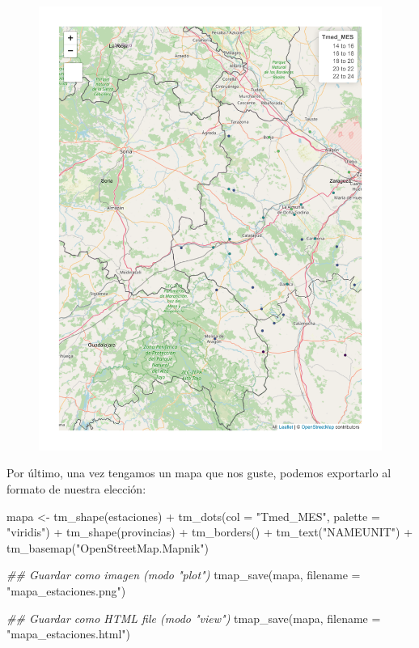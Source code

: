 \documentclass[
  letterpaper,
  DIV=11,
  numbers=noendperiod]{scrreprt}
\newenvironment{Shaded}{\begin{snugshade}}{\end{snugshade}}
\newcommand{\AttributeTok}[1]{\textcolor[rgb]{0.40,0.45,0.13}{#1}}
\newcommand{\DocumentationTok}[1]{\textcolor[rgb]{0.37,0.37,0.37}{\textit{#1}}}
\newcommand{\FunctionTok}[1]{\textcolor[rgb]{0.28,0.35,0.67}{#1}}
\newcommand{\NormalTok}[1]{\textcolor[rgb]{0.00,0.23,0.31}{#1}}
\newcommand{\OtherTok}[1]{\textcolor[rgb]{0.00,0.23,0.31}{#1}}
\newcommand{\SpecialCharTok}[1]{\textcolor[rgb]{0.37,0.37,0.37}{#1}}
\newcommand{\StringTok}[1]{\textcolor[rgb]{0.13,0.47,0.30}{#1}}
\begin{document}
\begin{figure}[H]

{\centering \includegraphics{03_DatosEspaciales_files/figure-pdf/unnamed-chunk-18-1.pdf}

}

\end{figure}

Por último, una vez tengamos un mapa que nos guste, podemos exportarlo
al formato de nuestra elección:

\begin{Shaded}
\begin{Highlighting}[]
\NormalTok{mapa }\OtherTok{\textless{}{-}} \FunctionTok{tm\_shape}\NormalTok{(estaciones) }\SpecialCharTok{+}
    \FunctionTok{tm\_dots}\NormalTok{(}\AttributeTok{col =} \StringTok{"Tmed\_MES"}\NormalTok{, }\AttributeTok{palette =} \StringTok{"viridis"}\NormalTok{) }\SpecialCharTok{+}
    \FunctionTok{tm\_shape}\NormalTok{(provincias) }\SpecialCharTok{+}
    \FunctionTok{tm\_borders}\NormalTok{() }\SpecialCharTok{+}
    \FunctionTok{tm\_text}\NormalTok{(}\StringTok{"NAMEUNIT"}\NormalTok{) }\SpecialCharTok{+}
    \FunctionTok{tm\_basemap}\NormalTok{(}\StringTok{"OpenStreetMap.Mapnik"}\NormalTok{)}

\DocumentationTok{\#\# Guardar como imagen (modo "plot")}
\FunctionTok{tmap\_save}\NormalTok{(mapa, }\AttributeTok{filename =} \StringTok{"mapa\_estaciones.png"}\NormalTok{)}

\DocumentationTok{\#\# Guardar como HTML file (modo "view")}
\FunctionTok{tmap\_save}\NormalTok{(mapa, }\AttributeTok{filename =} \StringTok{"mapa\_estaciones.html"}\NormalTok{)}
\end{Highlighting}
\end{Shaded}
\end{document}
